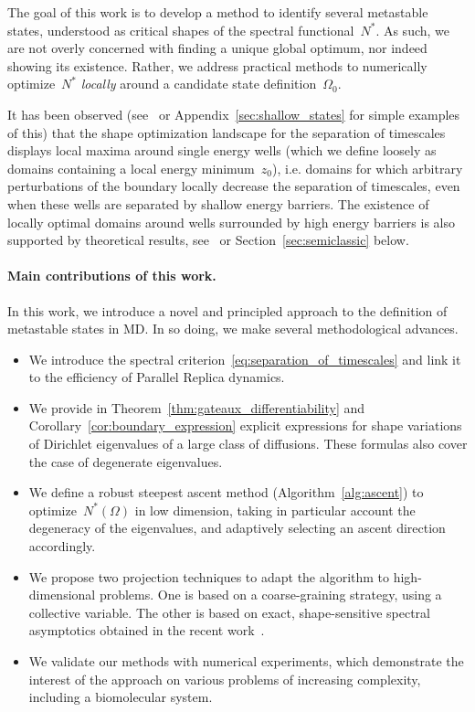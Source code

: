 \documentclass[a4]{article}
\newcommand{\1}{\mathbbm 1}
\begin{document}
    The goal of this work is to develop a method to identify several metastable states, understood as critical shapes of the spectral functional~$N^*$. As such, we are not overly concerned with finding a unique global optimum, nor indeed showing its existence. Rather, we address practical methods to numerically optimize~$N^*$ \textit{locally} around a candidate state definition~$\Omega_0$.
    
    It has been observed (see~\cite{PUV15} or Appendix~\ref{sec:shallow_states} for simple examples of this) that the shape optimization landscape for the separation of timescales displays local maxima around single energy wells (which we define loosely as domains containing a local energy minimum~$z_0$), i.e. domains for which arbitrary perturbations of the boundary locally decrease the separation of timescales, even when these wells are separated by shallow energy barriers.
    The existence of locally optimal domains around wells surrounded by high energy barriers is also supported by theoretical results, see~\cite[Section 3.3]{BLS24} or Section~\ref{sec:semiclassic} below.

    \paragraph{Main contributions of this work.}
    In this work, we introduce a novel and principled approach to the definition of metastable states in MD. In so doing, we make several methodological advances.
\begin{itemize}
    \item{We introduce the spectral criterion~\eqref{eq:separation_of_timescales} and link it to the efficiency of Parallel Replica dynamics.}
    \item{We provide in Theorem~\ref{thm:gateaux_differentiability} and Corollary~\ref{cor:boundary_expression} explicit expressions for shape variations of Dirichlet eigenvalues of a large class of diffusions. These formulas also cover the case of degenerate eigenvalues.}
    \item{We define a robust steepest ascent method (Algorithm~\ref{alg:ascent}) to optimize~$N^*(\Omega)$ in low dimension, taking in particular account the degeneracy of the eigenvalues, and adaptively selecting an ascent direction accordingly.}
    \item{We propose two projection techniques to adapt the algorithm to high-dimensional problems. One is based on a coarse-graining strategy, using a collective variable. The other is based on exact, shape-sensitive spectral asymptotics obtained in the recent work~\cite{BLS24}.}
    \item{We validate our methods with numerical experiments, which demonstrate the interest of the approach on various problems of increasing complexity, including a biomolecular system.}
\end{itemize}
\end{document}
